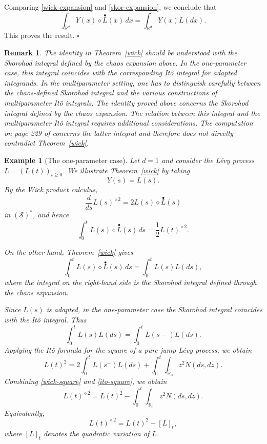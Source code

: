 \documentclass[12pt]{article}%
\newtheorem{example}[theorem]{Example}
\newtheorem{remark}[theorem]{Remark}
\newcommand{\fproof}{\hfill $\square$ \bigskip}
\numberwithin{equation}{section}
\begin{document}
Comparing \eqref{wick-expansion} and \eqref{skor-expansion}, we conclude that
\[
\int_{\mathbb R^d}
Y(x)\diamond\overset{\bullet} L(x)\,dx
=
\int_{\mathbb R^d}Y(x)L(dx).
\]
This proves the result.
\fproof
\begin{remark}
The identity in Theorem~\ref{wick} should be understood with
the Skorohod integral defined by the chaos expansion above. In the
one-parameter case, this integral coincides with the corresponding
It\^o integral for adapted integrands.
In the multiparameter setting, one has to distinguish carefully
between the chaos-defined Skorohod integral and the various
constructions of multiparameter It\^o integrals. The identity
proved above concerns the Skorohod integral defined by the chaos
expansion. The relation between this integral and the
multiparameter It\^o integral requires additional considerations.
The computation on page 229 of
\cite{HOUZ} concerns the latter integral and therefore does not
directly contradict Theorem~\ref{wick}.
\end{remark}
\begin{example}[The one-parameter case]
Let $d=1$ and consider the L\' evy process $L=(L(t))_{t\geq0}$.
We illustrate Theorem~\ref{wick} by taking
\[
Y(s)=L(s).
\]
By the Wick product calculus,
\[
\frac{d}{ds}L(s)^{\diamond 2}
=
2L(s)\diamond\overset{\bullet}{L}(s)
\]
in $(\mathcal S)^*$, and hence
\begin{equation}
\label{wick-square}
\int_0^t
L(s)\diamond\overset{\bullet}{L}(s)\,ds
=
\frac12L(t)^{\diamond2}.
\end{equation}

On the other hand, Theorem~\ref{wick} gives
\[
\int_0^t
L(s)\diamond\overset{\bullet}{L}(s)\,ds
=
\int_0^t L(s)L(ds),
\]
where the integral on the right-hand side is the Skorohod integral
defined through the chaos expansion.

Since $L(s)$ is adapted, in the one-parameter case the Skorohod
integral coincides with the It\^o integral. Thus
\[
\int_0^t L(s)L(ds)
=
\int_0^t L(s-)L(ds).
\]
Applying the It\^o formula for the square of a pure-jump L\' evy process,
we obtain
\begin{equation}
\label{ito-square}
L(t)^2
=
2\int_0^t L(s^-)L(ds)
+
\int_0^t\int_{\mathbb R_0}z^2N(ds,dz).
\end{equation}
Combining \eqref{wick-square} and \eqref{ito-square}, we obtain
\[
L(t)^{\diamond2}
=
L(t)^2
-
\int_0^t\int_{\mathbb R_0}z^2N(ds,dz).
\]
Equivalently,
\[
L(t)^{\diamond2}
=
L(t)^2-[L]_t,
\]
where $[L]_t$ denotes the quadratic variation of $L$.
\end{example}
\end{document}
